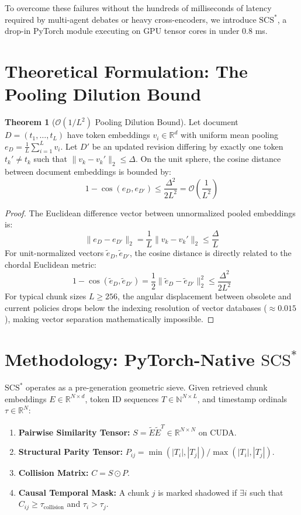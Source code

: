 \documentclass[11pt,a4paper]{article}
\theoremstyle{definition}
\newtheorem{theorem}{Theorem}
\begin{document}
To overcome these failures without the hundreds of milliseconds of latency required by multi-agent debates or heavy cross-encoders, we introduce $\text{SCS}^*$, a drop-in PyTorch module executing on GPU tensor cores in under 0.8 ms.

\section{Theoretical Formulation: The Pooling Dilution Bound}
\begin{theorem}[$\mathcal{O}(1/L^2)$ Pooling Dilution Bound]
Let document $D = (t_1, \dots, t_L)$ have token embeddings $v_i \in \mathbb{R}^d$ with uniform mean pooling $e_D = \frac{1}{L} \sum_{i=1}^L v_i$. Let $D'$ be an updated revision differing by exactly one token $t_k' \neq t_k$ such that $\|v_k - v_k'\|_2 \le \Delta$. On the unit sphere, the cosine distance between document embeddings is bounded by:
\begin{equation}
1 - \cos(e_D, e_{D'}) \le \frac{\Delta^2}{2 L^2} = \mathcal{O}\left(\frac{1}{L^2}\right)
\end{equation}
\end{theorem}
\begin{proof}
The Euclidean difference vector between unnormalized pooled embeddings is:
\begin{equation}
\|e_D - e_{D'}\|_2 = \frac{1}{L} \|v_k - v_k'\|_2 \le \frac{\Delta}{L}
\end{equation}
For unit-normalized vectors $\tilde{e}_D, \tilde{e}_{D'}$, the cosine distance is directly related to the chordal Euclidean metric:
\begin{equation}
1 - \cos(\tilde{e}_D, \tilde{e}_{D'}) = \frac{1}{2} \|\tilde{e}_D - \tilde{e}_{D'}\|_2^2 \le \frac{\Delta^2}{2 L^2}
\end{equation}
For typical chunk sizes $L \ge 256$, the angular displacement between obsolete and current policies drops below the indexing resolution of vector databases ($\approx 0.015$), making vector separation mathematically impossible.
\end{proof}

\section{Methodology: PyTorch-Native $\text{SCS}^*$}
$\text{SCS}^*$ operates as a pre-generation geometric sieve. Given retrieved chunk embeddings $E \in \mathbb{R}^{N \times d}$, token ID sequences $T \in \mathbb{N}^{N \times L}$, and timestamp ordinals $\tau \in \mathbb{R}^N$:
\begin{enumerate}
    \item \textbf{Pairwise Similarity Tensor:} $S = \tilde{E}\tilde{E}^T \in \mathbb{R}^{N \times N}$ on CUDA.
    \item \textbf{Structural Parity Tensor:} $P_{ij} = \min(|T_i|, |T_j|) / \max(|T_i|, |T_j|)$.
    \item \textbf{Collision Matrix:} $C = S \odot P$.
    \item \textbf{Causal Temporal Mask:} A chunk $j$ is marked shadowed if $\exists i$ such that $C_{ij} \ge \tau_{\text{collision}}$ and $\tau_i > \tau_j$.
\end{enumerate}
\end{document}
